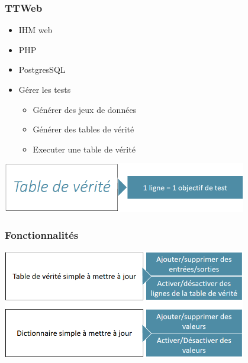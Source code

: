 \begin{frame}
    \frametitle{TTWeb}
    \begin{itemize}
        \item IHM web
        \item PHP
        \item PostgresSQL
        \item Gérer les tests
            \begin{itemize}
                \item Générer des jeux de données
                \item Générer des tables de vérité
                \item Executer une table de vérité
            \end{itemize}
    \end{itemize}
    \begin{center}
        \includegraphics[width=0.8\textwidth]{./img/truth_table.png}
    \end{center}
\end{frame}

\begin{frame}
    \frametitle{Fonctionnalités}
    \begin{center}
        \includegraphics[width=0.8\textwidth]{./img/ttweb.png}
    \end{center}
\end{frame}